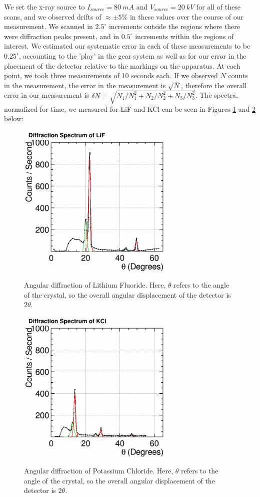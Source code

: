\documentclass[%
 reprint,
 amsmath,amssymb,
 aps,
 pra,
]{revtex4-1}
\begin{document}
We set the x-ray source to $I_{source} = 80~mA$ and $V_{source} = 20~kV$ for all of these scans, and we observed drifts of $\approx \pm 5\%$ in these values over the course of our measurement. We scanned in $2.5^\circ$ increments outside the regions where there were diffraction peaks present, and in $0.5^\circ$ increments within the regions of interest. We estimated our systematic error in each of these measurements to be $0.25^\circ$, accounting to the 'play' in the gear system as well as for our error in the placement of the detector relative to the markings on the apparatus. At each point, we took three measurements of 10 seconds each. If we observed $N$ counts in the measurement, the error in the measurement is $\sqrt{N}$, therefore the overall error in our measurement is $\delta N =\sqrt{N_1/N_1^2 + N_2/N_2^2 + N_3/N_3^2}$. The spectra, normalized for time, we measured for LiF and KCl can be seen in Figures \ref{fig:LiF} and \ref{fig:KCl} below:

\begin{figure}[H]
	\centering
	\includegraphics[width=8cm]{Diffraction_LiF.png}
	\caption{Angular diffraction of Lithium Fluoride. Here, $\theta$ refers to the angle of the crystal, so the overall angular displacement of the detector is $2 \theta$.}
	\label{fig:LiF}
\end{figure}

\begin{figure}[H]
	\centering
	\includegraphics[width=8cm]{Diffraction_KCl.png}
	\caption{Angular diffraction of Potassium Chloride. Here, $\theta$ refers to the angle of the crystal, so the overall angular displacement of the detector is $2 \theta$.}
	\label{fig:KCl}
\end{figure}
\end{document}
